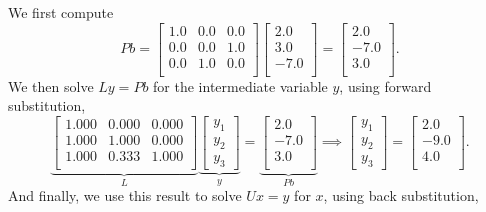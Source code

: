 We first compute 
$$P b = \left[
\begin{array}{ccc}
1.0 & 0.0 & 0.0 \\
0.0 & 0.0 & 1.0 \\
0.0 & 1.0 & 0.0 \\
\end{array}
\right] \left[
\begin{array}{r}
2.0 \\
3.0 \\
-7.0 \\
\end{array}
\right] = \left[
\begin{array}{r}
2.0 \\
-7.0 \\
3.0 \\
\end{array}
\right]. $$
We then solve $L y = P b$ for the intermediate variable $y$, using forward substitution, 
$$\underbrace{\left[ \begin{array}{ccc}
1.000 & 0.000 & 0.000 \\
1.000 & 1.000 & 0.000 \\
1.000 & 0.333 & 1.000 \\
\end{array}
\right]}_{L} \underbrace{\begin{bmatrix}y_1 \\y_2 \\ y_3 \end{bmatrix}}_{y} =\underbrace{ \left[
\begin{array}{r}
2.0 \\
-7.0 \\
3.0 \\
\end{array}
\right]}_{P b} \implies\begin{bmatrix}y_1 \\y_2 \\ y_3 \end{bmatrix} = \left[
\begin{array}{r}
2.0 \\
-9.0 \\
4.0 \\
\end{array}
\right]. $$
And finally, we use this result to solve $U x = y$ for $x$, using back substitution,
